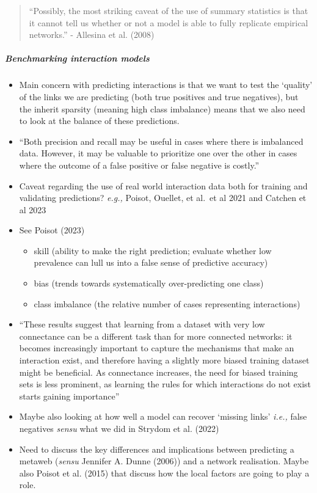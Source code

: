 \documentclass[
]{agujournal2019}
\let\oldsubparagraph\subparagraph
\renewcommand{\subparagraph}[1]{\oldsubparagraph{#1}\mbox{}}
\begin{document}
\begin{quote}
``Possibly, the most striking caveat of the use of summary statistics is
that it cannot tell us whether or not a model is able to fully replicate
empirical networks.'' - Allesina et al. (2008)
\end{quote}

\subparagraph{Benchmarking interaction
models}\label{benchmarking-interaction-models}

\begin{itemize}
\item
  Main concern with predicting interactions is that we want to test the
  `quality' of the links we are predicting (both true positives and true
  negatives), but the inherit sparsity (meaning high class imbalance)
  means that we also need to look at the balance of these predictions.
\item
  ``Both precision and recall may be useful in cases where there is
  imbalanced data. However, it may be valuable to prioritize one over
  the other in cases where the outcome of a false positive or false
  negative is costly.''
\item
  Caveat regarding the use of real world interaction data both for
  training and validating predictions? \emph{e.g.,} Poisot, Ouellet, et
  al.~et al 2021 and Catchen et al 2023
\item
  See Poisot (2023)

  \begin{itemize}
  \item
    skill (ability to make the right prediction; evaluate whether low
    prevalence can lull us into a false sense of predictive accuracy)
  \item
    bias (trends towards systematically over-predicting one class)
  \item
    class imbalance (the relative number of cases representing
    interactions)
  \end{itemize}
\item
  ``These results suggest that learning from a dataset with very low
  connectance can be a different task than for more connected networks:
  it becomes increasingly important to capture the mechanisms that make
  an interaction exist, and therefore having a slightly more biased
  training dataset might be beneficial. As connectance increases, the
  need for biased training sets is less prominent, as learning the rules
  for which interactions do not exist starts gaining importance''
\item
  Maybe also looking at how well a model can recover `missing links'
  \emph{i.e.,} false negatives \emph{sensu} what we did in Strydom et
  al. (2022)
\item
  Need to discuss the key differences and implications between
  predicting a metaweb (\emph{sensu} Jennifer A. Dunne (2006)) and a
  network realisation. Maybe also Poisot et al. (2015) that discuss how
  the local factors are going to play a role.
\end{itemize}
\end{document}

